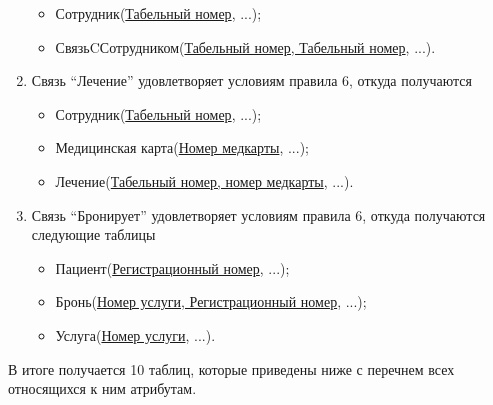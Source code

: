 \documentclass[14pt,a4paper,russian]{extreport}
\begin{document}
\begin{enumerate}
\begin{itemize}
            \item Сотрудник(\underline{Табельный номер}, ...);
            \item СвязьCСотрудником(\underline{Табельный номер, Табельный номер}, ...).
        \end{itemize}
    \item Связь ``Лечение'' удовлетворяет условиям правила 6, откуда получаются
        \begin{itemize}
            \item Сотрудник(\underline{Табельный номер}, ...);
            \item Медицинская карта(\underline{Номер медкарты}, ...);
            \item Лечение(\underline{Табельный номер, номер медкарты}, ...).
        \end{itemize}
    \item Связь ``Бронирует'' удовлетворяет условиям правила 6, откуда получаются следующие
        таблицы
        \begin{itemize}
            \item Пациент(\underline{Регистрационный номер}, ...);
            \item Бронь(\underline{Номер услуги, Регистрационный номер}, ...);
            \item Услуга(\underline{Номер услуги}, ...).
        \end{itemize}
\end{enumerate}
В итоге получается 10 таблиц, которые приведены ниже с перечнем всех относящихся к ним атрибутам.
\end{document}
